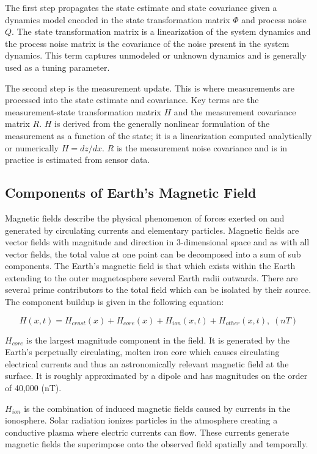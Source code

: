 \documentclass[conf]{new-aiaa}
\begin{document}
The first step propagates the state estimate and state covariance given a dynamics model encoded in the state transformation matrix \(\Phi\) and process noise \(Q\). The state transformation matrix is a linearization of the system dynamics and the process noise matrix is the covariance of the noise present in the system dynamics. This term captures unmodeled or unknown dynamics and is generally used as a tuning parameter.

The second step is the measurement update. This is where measurements are processed into the state estimate and covariance. Key terms are the measurement-state transformation matrix \(H\) and the measurement covariance matrix \(R\). \(H\) is derived from the generally nonlinear formulation of the measurement as a function of the state; it is a linearization computed analytically or numerically \(H = dz/dx\). \(R\) is the measurement noise covariance and is in practice is estimated from sensor data.

\subsection{Components of Earth's Magnetic Field} %

Magnetic fields describe the physical phenomenon of forces exerted on and generated by circulating currents and elementary particles. Magnetic fields are vector fields with magnitude and direction in 3-dimensional space and as with all vector fields, the total value at one point can be decomposed into a sum of sub components. The Earth's magnetic field is that which exists within the Earth extending to the outer magnetosphere several Earth radii outwards. There are several prime contributors to the total field which can be isolated by their source. The component buildup is given in the following equation:

\begin{equation}
    H(x, t) = H_{crust}(x) + H_{core}(x) + H_{ion}(x, t) + H_{other}(x, t), \; (nT)
\end{equation}

\(H_{core}\) is the largest magnitude component in the field. It is generated by the Earth's perpetually circulating, molten iron core which causes circulating electrical currents and thus an astronomically relevant magnetic field at the surface. It is roughly approximated by a dipole and has magnitudes on the  order of 40,000 (nT).

\(H_{ion}\) is the combination of induced magnetic fields caused by currents in the ionosphere. Solar radiation ionizes particles in the atmosphere creating a conductive plasma where electric currents can flow. These currents generate magnetic fields the superimpose onto the observed field spatially and temporally.
\end{document}
